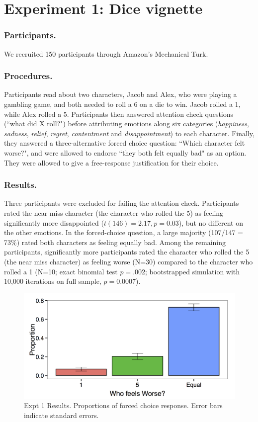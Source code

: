 \documentclass[10pt,letterpaper]{article}
\begin{document}
\section{Experiment 1: Dice vignette}

\subsubsection{Participants.} We recruited 150 participants through Amazon's Mechanical Turk.

\subsubsection{Procedures.} Participants read about two characters, Jacob and Alex, who were playing a gambling game, and both needed to roll a 6 on a die to win. Jacob rolled a 1, while Alex rolled a 5. Participants then answered attention check questions (``what did X roll?") before attributing emotions along six categories (\textit{happiness}, \textit{sadness}, \textit{relief}, \textit{regret}, \textit{contentment} and \textit{disappointment})  to each character. Finally, they answered a three-alternative forced choice question: ``Which character felt worse?", and were allowed to endorse ``they both felt equally bad" as an option. They were allowed to give a free-response justification for their choice.

\subsubsection{Results.} Three participants were excluded for failing the attention check. Participants rated the near miss character (the character who rolled the 5) as feeling significantly more disappointed ($t(146)=2.17, p=0.03$), but no different on the other emotions. In the forced-choice question, a large majority (107/147 = 73\%) rated both characters as feeling equally bad. Among the remaining participants, significantly more participants rated the character who rolled the 5 (the near miss character) as feeling worse (N=30) compared to the character who rolled a 1 (N=10; exact binomial test $p=.002$; bootstrapped simulation with 10,000 iterations on full sample, $p=0.0007$).


\begin{figure}[htb!]
\includegraphics[width=\columnwidth]{images/Expt1results.png}
\caption{ Expt 1 Results. Proportions of forced choice response. Error bars indicate standard errors. }
\label{Expt1ResultFig}
\end{figure}
\end{document}
